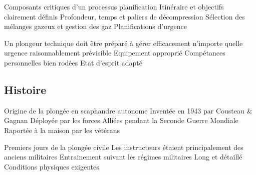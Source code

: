 \begin{frame}{\insertsubsection}
	\begin{outline}
		\1 Composants critiques d'un processus planification
			\2 Itinéraire et objectifs clairement définis
			\2 Profondeur, temps et paliers de décompression
			\2 Sélection des mélanges gazeux et gestion des gaz
			\2 Planifications d'urgence
	\end{outline}
\end{frame}

\begin{frame}{\insertsubsection}
	\begin{outline}
		\1  Un plongeur technique doit être préparé à gérer efficacement n'importe quelle urgence raisonnablement prévisible
			\2 Equipement approprié
			\2 Compétances personnelles bien rodées
			\2 Etat d'esprit adapté 
	\end{outline}
\end{frame}


\subsection{Histoire}

\begin{frame}{\insertsubsection}
	\begin{outline}
		\1 Origine de la plongée en scaphandre autonome
			\2 Inventée en 1943 par Cousteau \& Gagnan
			\2 Déployée par les forces Alliées pendant la Seconde Guerre Mondiale
			\2 Raportée à la maison par les vétérans
	\end{outline}
\end{frame}

\begin{frame}{\insertsubsection}
	\begin{outline}
		\1 Premiers jours de la plongée civile
			\2 Les instructeurs étaient principalement des anciens militaires
			\2 Entrainement suivant les régimes militaires
				\3 Long et détaillé
				\3 Conditions physiques exigentes
	\end{outline}
\end{frame}

